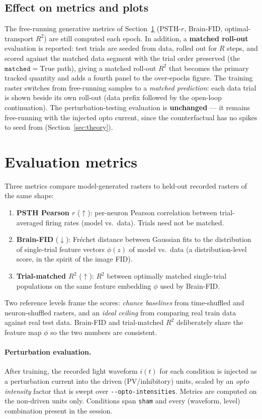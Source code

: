 \documentclass[11pt]{article}
\newcommand{\code}[1]{\texttt{#1}}
\begin{document}
\subsection{Effect on metrics and plots}
The free-running generative metrics of Section~\ref{sec:metrics} (PSTH-$r$,
Brain-FID, optimal-transport $R^2$) are still computed each epoch. In addition, a
\textbf{matched roll-out} evaluation is reported: test trials are seeded from data,
rolled out for $R$ steps, and scored against the matched data segment with the
trial order preserved (the $\mathtt{matched}{=}\mathrm{True}$ path), giving a
matched roll-out $R^2$ that becomes the primary tracked quantity and adds a fourth
panel to the over-epochs figure. The training raster switches from free-running
samples to a \emph{matched prediction}: each data trial is shown beside its own
roll-out (data prefix followed by the open-loop continuation). The
perturbation-testing evaluation is \textbf{unchanged} --- it remains free-running
with the injected opto current, since the counterfactual has no spikes to seed
from (Section~\ref{sec:theory}).

\section{Evaluation metrics}
\label{sec:metrics}
Three metrics compare model-generated rasters to held-out recorded rasters of the
same shape:
\begin{enumerate}[leftmargin=1.6em]
\item \textbf{PSTH Pearson $r$} ($\uparrow$): per-neuron Pearson correlation
between trial-averaged firing rates (model vs.\ data). Trials need not be matched.
\item \textbf{Brain-FID} ($\downarrow$): Fr\'echet distance between Gaussian fits
to the distribution of single-trial feature vectors $\phi(z)$ of model vs.\ data
(a distribution-level score, in the spirit of the image FID).
\item \textbf{Trial-matched $R^2$} ($\uparrow$): $R^2$ between optimally matched
single-trial populations on the same feature embedding $\phi$ used by Brain-FID.
\end{enumerate}
Two reference levels frame the scores: \emph{chance baselines} from time-shuffled
and neuron-shuffled rasters, and an \emph{ideal ceiling} from comparing real
train data against real test data. Brain-FID and trial-matched $R^2$ deliberately
share the feature map $\phi$ so the two numbers are consistent.

\paragraph{Perturbation evaluation.} After training, the recorded light waveform
$i(t)$ for each condition is injected as a perturbation current into the driven
(PV/inhibitory) units, scaled by an \emph{opto intensity} factor that is swept
over \code{-{}-opto-intensities}. Metrics are computed on the non-driven units
only. Conditions span \code{sham} and every (waveform, level) combination present
in the session.
\end{document}
